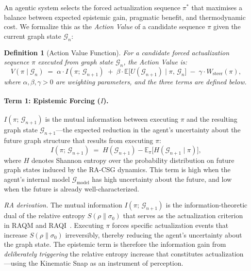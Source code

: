 \documentclass[11pt,a4paper]{article}
\newtheorem{definition}[theorem]{Definition}
\theoremstyle{remark}
\newcommand{\GG}{\mathcal{G}}
\begin{document}
An agentic system selects the forced actualization sequence $\pi^*$ that
maximises a balance between expected epistemic gain, pragmatic benefit, and
thermodynamic cost. We formalize this as the \emph{Action Value} of a candidate
sequence $\pi$ given the current graph state $\GG_n$:

\begin{definition}[Action Value Function]
\label{def:actionvalue}
For a candidate forced actualization sequence $\pi$ executed from graph state
$\GG_n$, the Action Value is:
\begin{equation}
  V(\pi \mid \GG_n)
  \;=\;
  \alpha \cdot I(\pi;\, \GG_{n+1})
  \;+\;
  \beta \cdot \mathbb{E}\bigl[U(\GG_{n+1}) \mid \pi,\, \GG_n\bigr]
  \;-\;
  \gamma \cdot W_{\mathrm{steer}}(\pi),
  \label{eq:actionvalue}
\end{equation}
where $\alpha, \beta, \gamma > 0$ are weighting parameters, and the three terms
are defined below.
\end{definition}

\paragraph{Term 1: Epistemic Forcing ($I$).}
$I(\pi;\, \GG_{n+1})$ is the mutual information between executing $\pi$ and the
resulting graph state $\GG_{n+1}$---the expected reduction in the agent's
uncertainty about the future graph structure that results from executing $\pi$:
\begin{equation}
  I(\pi;\, \GG_{n+1})
  \;=\;
  H(\GG_{n+1}) - \mathbb{E}_{\pi}\bigl[H(\GG_{n+1} \mid \pi)\bigr],
\end{equation}
where $H$ denotes Shannon entropy over the probability distribution on future graph
states induced by the RA-CSG dynamics. This term is high when the agent's internal
model $\GG_{\mathrm{model}}$ has high uncertainty about the future, and low when
the future is already well-characterized.

\emph{RA derivation.} The mutual information $I(\pi;\, \GG_{n+1})$ is the
information-theoretic dual of the relative entropy
$S(\rho \| \sigma_0)$ that serves as the actualization criterion in RAQM
and RAQI~\citep{Sandeman2026a,Sandeman2026d}. Executing $\pi$ forces specific
actualization events that increase $S(\rho \| \sigma_0)$ irreversibly, thereby
reducing the agent's uncertainty about the graph state. The epistemic term is
therefore the information gain from \emph{deliberately triggering} the relative
entropy increase that constitutes actualization---using the Kinematic Snap as an
instrument of perception.
\end{document}
